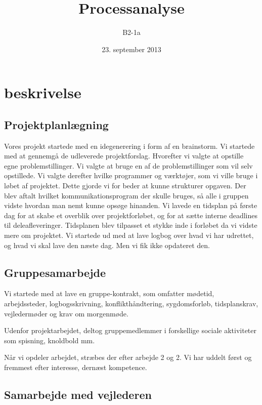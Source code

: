 


\title{Processanalyse}
\author{B2-1a}
\date{23. september 2013}
\maketitle



\section{beskrivelse}

\subsection{Projektplanlægning}

Vores projekt startede med en idegenerering i form af en brainstorm. Vi startede med at gennemgå de udleverede projektforslag. Hvorefter vi valgte at opstille egne problemstillinger. Vi valgte at bruge en af de problemstillinger som vil selv opstillede. 
Vi valgte derefter hvilke programmer og værktøjer, som vi ville bruge i løbet af projektet. Dette gjorde vi for beder at kunne strukturer opgaven.  Der blev aftalt hvilket kommunikationsprogram der skulle bruges, så alle i gruppen vidste hvordan man nemt kunne opsøge hinanden. 
Vi lavede en tidsplan på første dag for at skabe et overblik over projektforløbet, og for at sætte interne deadlines til deleafleveringer. Tidsplanen blev tilpasset et stykke inde i forløbet da vi vidste mere om projektet.
Vi startede ud med at lave logbog over hvad vi har udrettet, og hvad vi skal lave den næste dag. Men vi fik ikke opdateret den.


\subsection{Gruppesamarbejde}

Vi startede med at lave en gruppe-kontrakt, som omfatter mødetid, arbejdssteder, logbogsskrivning, konflikthåndtering, sygdomsforløb, tidsplanskrav, vejledermøder og krav om morgenmøde.

Udenfor projektarbejdet, deltog gruppemedlemmer i forskellige sociale aktiviteter som spisning, knoldbold mm.

Når vi opdeler arbejdet, stræbes der efter arbejde 2 og 2. Vi har uddelt først og fremmest efter interesse, dernæst kompetence.

\subsection{Samarbejde med vejlederen}

